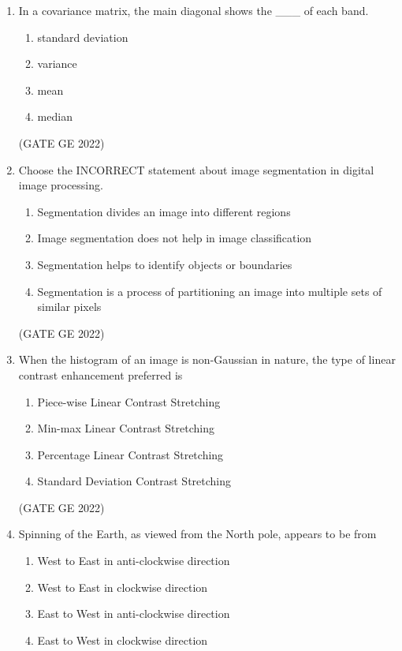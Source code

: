 \documentclass[a4paper, 11pt]{article}
\begin{document}
\begin{enumerate}
\item In a covariance matrix, the main diagonal shows the \_\_\_ of each band.
\begin{enumerate}
    \item standard deviation
    \item variance
    \item mean
    \item median
\end{enumerate}

\hfill (GATE GE 2022)

\item Choose the INCORRECT statement about image segmentation in digital image processing.
\begin{enumerate}
    \item Segmentation divides an image into different regions
    \item Image segmentation does not help in image classification
    \item Segmentation helps to identify objects or boundaries
    \item Segmentation is a process of partitioning an image into multiple sets of similar pixels
\end{enumerate}

\hfill (GATE GE 2022)

\item When the histogram of an image is non-Gaussian in nature, the type of linear contrast enhancement preferred is
\begin{enumerate}
    \item Piece-wise Linear Contrast Stretching
    \item Min-max Linear Contrast Stretching
    \item Percentage Linear Contrast Stretching
    \item Standard Deviation Contrast Stretching
\end{enumerate}

\hfill (GATE GE 2022)

\item Spinning of the Earth, as viewed from the North pole, appears to be from
\begin{enumerate}
    \item West to East in anti-clockwise direction
    \item West to East in clockwise direction
    \item East to West in anti-clockwise direction
    \item East to West in clockwise direction
\end{enumerate}


\end{enumerate}
\end{document}
